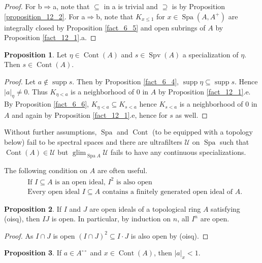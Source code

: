 \documentclass[10pt]{article}
\numberwithin{equation}{section}
\theoremstyle{definition}
\newtheorem{proposition}{Proposition}[subsection]
\DeclareMathOperator{\supp}{supp}
\DeclareMathOperator{\Spa}{Spa}
\DeclareMathOperator{\glim}{glim}
\DeclareMathOperator{\Spv}{Spv}
\DeclareMathOperator{\Cont}{Cont}
\newcommand{\U}[0]{\mathcal{U}}
\newcommand{\ab}[1]{\vert #1 \vert}
\newcommand{\dcirc}[0]{{\circ\circ}}
\begin{document}
\begin{proof}
    For b$\Rightarrow$a, note that $\subseteq $ in a is trivial and $\supseteq$ is by Proposition \ref{proposition_12_2}. For a$\Rightarrow$b, note that $K_{x\leq1}$ for $x\in\Spa(A,A^+)$ are integrally closed by Proposition \ref{fact_6_5} and open subrings of $A$ by Proposition \ref{fact_12_1}.a.
\end{proof}
\begin{proposition}
    \label{fact_13_5}
    Let $\eta\in\Cont(A)$ and $s\in\Spv(A)$ a specialization of $\eta$. Then $s\in\Cont(A)$.
\end{proposition}
\begin{proof}
    Let $a\not\in\supp s$. Then by Proposition \ref{fact_6_4}, $\supp\eta\subseteq\supp s$. Hence $\ab{a}_{\eta}\not=0$. Thus $K_{\eta<a}$ is a neighborhood of $0$ in $A$ by Proposition \ref{fact_12_1}.e. By Proposition \ref{fact_6_6}, $K_{\eta<a}\subseteq K_{s<a}$ hence $K_{s<a}$ is a neighborhood of $0$ in $A$ and again by Proposition \ref{fact_12_1}.e, hence for $s$ as well.
\end{proof}
Without further assumptions, $\Spa$ and $\Cont$ (to be equipped with a topology below) fail to be spectral spaces and there are ultrafilters $\U$ on $\Spa$ such that $\Cont(A)\in\U$ but $\glim_{\Spa A}\U$ fails to have any continuous specializations.
\par The following condition on $A$ are often useful.
\begin{align*}
    &\text{If $I\subseteq A$ is an open ideal, $I^2$ is also open} \tag{oisq}\\
    &\text{Every open ideal $I\subseteq A$ contains a finitely generated open ideal of $A$.}\tag{oifin}
\end{align*}
\begin{proposition}
    \label{fact_13_6}
    If $I$ and $J$ are open ideals of a topological ring $A$ satisfying (oisq), then $IJ$ is open. In particular, by induction on $n$, all $I^n$ are open.
\end{proposition}
\begin{proof}
    As $I\cap J$ is open $(I\cap J)^2 \subseteq I\cdot J$ is also open by (oisq).
\end{proof}
\begin{proposition}
    \label{fact_13_6_dash}
    If $a\in A^\dcirc$ and $x\in\Cont(A)$, then $\ab{a}_x<1$.
\end{proposition}
\end{document}
